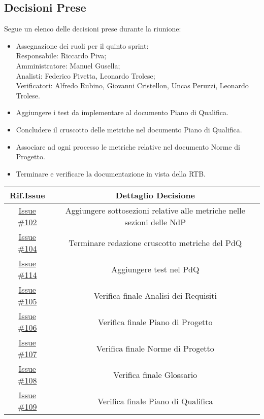 \documentclass[10pt]{article}
\begin{document}
\subsection{Decisioni Prese}
Segue un elenco delle decisioni prese durante la riunione:
\begin{itemize}
    \item   Assegnazione dei ruoli per il quinto sprint:\\
            Responsabile: Riccardo Piva;\\
            Amministratore: Manuel Gusella;\\
            Analisti: Federico Pivetta, Leonardo Trolese;\\
            Verificatori: Alfredo Rubino, Giovanni Cristellon, Uncas Peruzzi, Leonardo Trolese.\\
    \item Aggiungere i test da implementare al documento Piano di Qualifica.
    \item Concludere il cruscotto delle metriche nel documento Piano di Qualifica.
    \item Associare ad ogni processo le metriche relative nel documento Norme di Progetto.
    \item Terminare e verificare la documentazione in vista della RTB.
\end{itemize}
\begin{center}
\begin{tabular}{|>{\hspace{20pt}}c<{\hspace{20pt}}|>{\hspace{20pt}}c<{\hspace{20pt}}|}
	\hline
	    \textbf{Rif.Issue} & \textbf{Dettaglio Decisione}\\
	\hline
		\href{https://github.com/SevenBitsSwe/7BitsDocs/issues/102}{Issue \#102} & Aggiungere sottosezioni relative alle metriche nelle sezioni delle NdP\\
	\hline
        \href{https://github.com/SevenBitsSwe/7BitsDocs/issues/104}{Issue \#104} & Terminare redazione cruscotto metriche del PdQ\\
	\hline
        \href{https://github.com/SevenBitsSwe/7BitsDocs/issues/114}{Issue \#114} & Aggiungere test nel PdQ\\
	\hline
        \href{https://github.com/SevenBitsSwe/7BitsDocs/issues/105}{Issue \#105} & Verifica finale Analisi dei Requisiti\\
	\hline
        \href{https://github.com/SevenBitsSwe/7BitsDocs/issues/106}{Issue \#106} & Verifica finale Piano di Progetto\\
	\hline
        \href{https://github.com/SevenBitsSwe/7BitsDocs/issues/107}{Issue \#107} & Verifica finale Norme di Progetto\\
	\hline
        \href{https://github.com/SevenBitsSwe/7BitsDocs/issues/108}{Issue \#108} & Verifica finale Glossario\\
	\hline
        \href{https://github.com/SevenBitsSwe/7BitsDocs/issues/109}{Issue \#109} & Verifica finale Piano di Qualifica\\
	\hline
\end{tabular}
\end{center}
\end{document}
